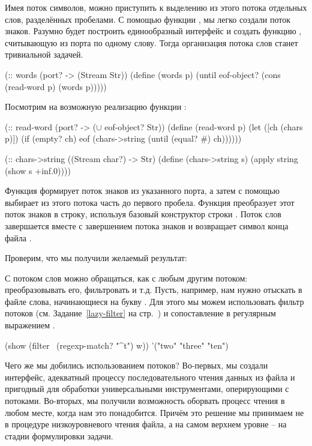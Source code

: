{Имея поток символов, можно приступить к выделению из этого потока отдельных слов, разделённых пробелами. С помощью функции , мы легко создали поток знаков. Разумно будет построить единообразный интерфейс и создать функцию , считывающую из порта по одному слову. Тогда организация потока слов станет тривиальной задачей.
\begin{Definition}[emph={p,ch,s}]
(:: words (port? -> (Stream Str))
  (define (words p) 
    (until eof-object? 
           (cons~ (read-word p) (words p)))))
\end{Definition}

Посмотрим на возможную реализацию функции :
\begin{Definition}[emph={p,ch,s}]
(:: read-word (port? -> ($\cup$ eof-object? Str))
  (define (read-word p)
    (let ([ch (chars p)])
      (if (empty? ch)
          eof
          (chars->string (until (equal? #\space) ch))))))

(:: chars->string ((Stream char?) -> Str)
  (define (chars->string s) 
    (apply string (show s +inf.0))))
\end{Definition}
\noindent
Функция  формирует поток знаков из указанного порта, а затем с помощью  выбирает из этого потока часть до первого пробела. Функция  преобразует этот поток знаков в строку, используя базовый конструктор строки . Поток слов завершается вместе с завершением потока знаков и возвращает символ конца файла .

Проверим, что мы получили желаемый результат:

С потоком слов можно обращаться, как с любым другим потоком: преобразовывать его, фильтровать и т.д. Пусть, например, нам нужно отыскать в файле слова, начинающиеся на букву . Для этого мы можем использовать фильтр потоков  (см. Задание~\ref{lazy-filter} на стр.~\pageref{lazy-filter}) и сопоставление в регулярным выражением .

\REPL
 {(show (filter~ (regexp-match? "^t") w))}
 {'("two" "three" "ten")}

Чего же мы добились использованием потоков? Во-первых, мы создали интерфейс, адекватный процессу последовательного чтения данных из файла и пригодный для обработки универсальными инструментами, оперирующими с потоками.
Во-вторых, мы получили возможность оборвать процесс чтения в любом месте, когда нам это понадобится. Причём это решение мы принимаем не в процедуре низкоуровневого чтения файла, а на самом верхнем уровне – на стадии формулировки задачи. 

}
